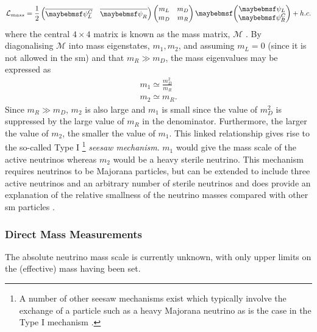 \begin{equation}
    \mathcal{L}_{mass} = \frac{1}{2} 
    \begin{pmatrix}
    \overline{\psi_L^C} & \overline{\psi_R^{\phantom{C}}}
    \end{pmatrix}
    \begin{pmatrix}
    m_L & m_D \\
    m_D & m_R
    \end{pmatrix}
    \twomatrix {\psi_L} {\psi_R^C} + h.c.
\end{equation}
where the central $4 \times 4$ matrix is known as the mass matrix, $\mathcal{M}$ \cite{White_Paper}. By diagonalising $\mathcal{M}$ into mass eigenstates, $m_1, m_2$, and assuming $m_L = 0$ (since it is not allowed in the \gls{sm}) and that $m_R \gg m_D$, the mass eigenvalues may be expressed as
\begin{equation}
\begin{split}
    m_1 \simeq \frac{m_D^2}{m_R} \\
    m_2 \simeq m_R.
\end{split}
\end{equation}
Since $m_R \gg m_D$, $m_2$ is also large and $m_1$ is small since the value of $m_D^2$ is suppressed by the large value of $m_R$ in the denominator. Furthermore, the larger the value of $m_2$, the smaller the value of $m_1$. This linked relationship gives rise to the so-called Type I \footnote{A number of other seesaw mechanisms exist which typically involve the exchange of a particle such as a heavy Majorana neutrino as is the case in the Type I mechanism \cite{White_Paper}.} \textit{seesaw mechanism}. $m_1$ would give the mass scale of the active neutrinos whereas $m_2$ would be a heavy sterile neutrino. This mechanism requires neutrinos to be Majorana particles, but can be extended to include three active neutrinos and an arbitrary number of sterile neutrinos and does provide an explanation of the relative smallness of the neutrino masses compared with other \gls{sm} particles \cite{Fundamentals_of_Neutrino_Physics_and_Astrophysics}. 

\subsubsection{Direct Mass Measurements}\label{sec:direct_mass_measurement}
The absolute neutrino mass scale is currently unknown, with only upper limits on the (effective) mass having been set. 

